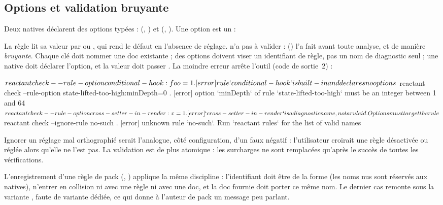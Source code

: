 \subsection{Options et validation bruyante}
\label{sec:api-regles-options}

Deux natives déclarent des options typées :  (, ) et  (, ). Une option est un  :


La règle lit sa valeur par  ou , qui rend le défaut en l'absence de réglage.  n'a pas à valider :  () l'a fait avant toute analyse, et de manière \emph{bruyante}. Chaque clé doit nommer une doc existante ; des options doivent viser un identifiant de règle, pas un nom de diagnostic seul ; une native doit déclarer l'option, et la valeur doit passer . La moindre erreur arrête l'outil (code de sortie~2) :

\begin{sortie}
$ reactant check --rule-option conditional-hook:foo=1 .
[error] rule `conditional-hook` is built-in and declares no options
$ reactant check --rule-option state-lifted-too-high:minDepth=0 .
[error] option `minDepth` of rule `state-lifted-too-high` must be an integer between 1 and 64
$ reactant check --rule-option cross-setter-in-render:x=1 .
[error] `cross-setter-in-render` is a diagnostic name, not a rule id. Options must target the rule
$ reactant check --ignore-rule no-such .
[error] unknown rule `no-such`. Run `reactant rules` for the list of valid names
\end{sortie}

Ignorer un réglage mal orthographié serait l'analogue, côté configuration, d'un faux négatif : l'utilisateur croirait une règle désactivée ou réglée alors qu'elle ne l'est pas. La validation est de plus atomique : les surcharges ne sont remplacées qu'après le succès de toutes les vérifications.

L'enregistrement d'une règle de pack (, ) applique la même discipline : l'identifiant doit être de la forme  (les noms nus sont réservés aux natives), n'entrer en collision ni avec une règle ni avec une doc, et la doc fournie doit porter ce même nom. Le dernier cas remonte sous la variante , faute de variante dédiée, ce qui donne à l'auteur de pack un message peu parlant.

